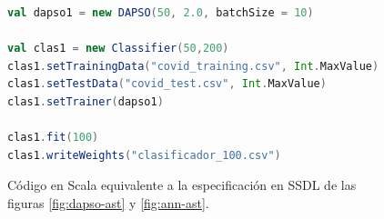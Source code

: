 \vspace{10pt}
\begin{figure}[ht!]
    \centering
    \begin{lstlisting}[language=Scala]
val dapso1 = new DAPSO(50, 2.0, batchSize = 10)

val clas1 = new Classifier(50,200)
clas1.setTrainingData("covid_training.csv", Int.MaxValue)
clas1.setTestData("covid_test.csv", Int.MaxValue)
clas1.setTrainer(dapso1)

clas1.fit(100)
clas1.writeWeights("clasificador_100.csv")
    \end{lstlisting}
    \caption{Código en Scala equivalente a la especificación en SSDL de las figuras \ref{fig:dapso-ast} y \ref{fig:ann-ast}.}
    \label{fig:ssdl-scala}
\end{figure}

\endinput

